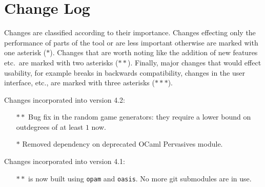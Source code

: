\section{Change Log}

Changes are classified according to their importance. Changes effecting only the performance of
parts of the tool or are less important otherwise are marked with one asterisk ($\ast$). Changes
that are worth noting like the addition of new features etc.\ are marked with two asterisks 
($\ast\ast$). Finally, major changes that would effect usability, for example breaks in backwards
compatibility, changes in the user interface, etc., are marked with three asterisks ($\ast\ast\ast$).

Changes incorporated into version 4.2:
\begin{itemize}
\item[$\ast \ast$] Bug fix in the random game generators: they require a lower bound on outdegrees of at least $1$ now. 
\item[$\ast$] Removed dependency on deprecated OCaml Pervasives module.
\end{itemize}

Changes incorporated into version 4.1:
\begin{itemize}
\item[$\ast\ast$] \pgsolver is now built using \texttt{opam} and \texttt{oasis}. No more git submodules are in use.
\end{itemize}

